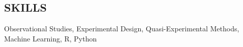\documentclass{res}
\begin{document}
\begin{resume}
\begin{comment}
\textbf{Columbia University Departments of Mathematics and Statistics}, New York, NY
  \\ \textit{Undergraduate Teaching Assistant}\hfill Spring 2014 - Spring 2016
\begin{itemize}
\item Held regular office hours for calculus, linear algebra, and statistics students
\item Evaluated assignments and provided feedback to students
\end{itemize}
\end{comment}



\section{SKILLS}
Observational Studies, Experimental Design, Quasi-Experimental Methods, Machine Learning, R, Python %


\end{resume}
\end{document}

